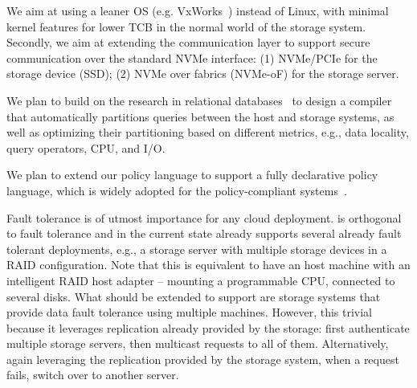  We aim at using a leaner OS (e.g. VxWorks~\cite{vxworks}) instead of Linux, with minimal kernel features for lower TCB in the normal world of the storage system.
Secondly, we aim at extending the communication layer to support secure communication over the standard NVMe interface: (1) NVMe/PCIe for the storage device (SSD); (2) NVMe over fabrics (NVMe-oF) for the storage server. %




  We plan to build on the research in relational databases~\cite{DBtoaster,Gu:2016:BFN:3001136.3001154} to design a compiler that automatically partitions queries between the host and storage systems, as well as optimizing their partitioning based on different metrics, e.g., data locality, query operators, CPU, and I/O.

 We plan to extend our policy language to support a fully declarative policy language, which is widely adopted for the policy-compliant systems~\cite{Krahn-eurosys-2018, Vahldiek-Oberwagner-eurosys-2015, elnikety-security-2016, mehta-security-2017, garg-ieeesp-2010}.
\fi


Fault tolerance is of utmost importance for any cloud deployment.
\project{} is orthogonal to fault tolerance and in the current state already supports several already fault tolerant deployments, e.g., a storage server with multiple storage devices in a RAID configuration. Note that this is equivalent to have an host machine with an intelligent RAID host adapter -- mounting a programmable CPU, connected to several disks. What \project{} should be extended to support are storage systems that provide data fault tolerance using multiple machines. However, this trivial because it leverages replication already provided by the storage: first authenticate multiple storage servers, then multicast requests to all of them. Alternatively, again leveraging the replication provided by the storage system, when a request fails, switch over to another server.

